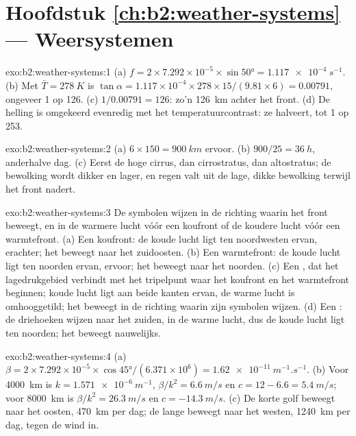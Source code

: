 \section*{Hoofdstuk \ref{ch:b2:weather-systems} --- Weersystemen}

\begin{solution}{exo:b2:weather-systems:1}
(a) $f = 2 \times 7.292 \times 10^{-5} \times \sin\ang{50} = \qty{1.117e-4}{s^{-1}}$. (b) Met
$\bar T = \qty{278}{K}$ is $\tan\alpha = 1.117 \times 10^{-4} \times 278 \times 15/(9.81 \times 6)
= 0.00791$, ongeveer 1 op 126. (c) $1/0.00791 = 126$: zo'n \qty{126}{km} achter het front. (d) De
helling is omgekeerd evenredig met het temperatuurcontrast: ze halveert, tot 1 op 253.
\end{solution}

\begin{solution}{exo:b2:weather-systems:2}
(a) $6 \times 150 = \qty{900}{km}$ ervoor. (b) $900/25 = \qty{36}{h}$, anderhalve dag. (c) Eerst
de hoge cirrus, dan cirrostratus, dan altostratus; de bewolking wordt dikker en lager, en regen
valt uit de lage, dikke bewolking terwijl het front nadert.
\end{solution}

\begin{solution}{exo:b2:weather-systems:3}
De symbolen wijzen in de richting waarin het front beweegt, en in de warmere lucht vóór een koufront of de
koudere lucht vóór een warmtefront. (a) Een koufront: de koude lucht ligt ten noordwesten ervan, erachter;
het beweegt naar het zuidoosten. (b) Een warmtefront: de koude lucht ligt ten noorden ervan, ervoor; het beweegt
naar het noorden. (c) Een , dat het lagedrukgebied verbindt met het tripelpunt waar het koufront en het
warmtefront beginnen; koude lucht ligt aan beide kanten ervan, de warme lucht is omhooggetild; het beweegt in de richting waarin zijn
symbolen wijzen. (d) Een : de driehoeken wijzen naar het zuiden, in de warme lucht, dus de koude
lucht ligt ten noorden; het beweegt nauwelijks.
\end{solution}

\begin{solution}{exo:b2:weather-systems:4}
(a) $\beta = 2 \times 7.292 \times 10^{-5} \times \cos\ang{45}/(6.371 \times 10^6) =
\qty{1.62e-11}{m^{-1}.s^{-1}}$. (b) Voor \qty{4000}{km} is $k = \qty{1.571e-6}{m^{-1}}$, $\beta/k^2 =
\qty{6.6}{m/s}$ en $c = 12 - 6.6 = \qty{5.4}{m/s}$; voor \qty{8000}{km} is $\beta/k^2 =
\qty{26.3}{m/s}$ en $c = \qty{-14.3}{m/s}$. (c) De korte golf beweegt naar het oosten, \qty{470}{km} per dag;
de lange beweegt naar het westen, \qty{1240}{km} per dag, tegen de wind in.
\end{solution}

